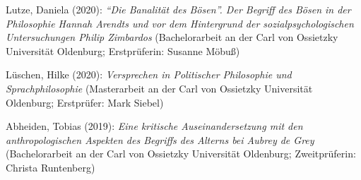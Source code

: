 \documentclass[a4paper,10pt]{article}
\newenvironment{literature}{%
   \parskip6pt\parindent0pt\raggedright
   \def\lititem{\hangindent=1cm\hangafter1}}{%
   \par\ignorespaces}
\begin{document}
\begin{literature}
\lititem Lutze, Daniela (2020): \textit{\enquote{Die Banalität des Bösen}. Der Begriff des Bösen in der Philosophie Hannah Arendts und vor dem Hintergrund der sozialpsychologischen Untersuchungen Philip Zimbardos} (Bachelorarbeit an der Carl von Ossietzky Universität Oldenburg; Erstprüferin: Susanne Möbuß)

\lititem Lüschen, Hilke (2020): \textit{Versprechen in Politischer Philosophie und Sprachphilosophie} (Masterarbeit an der Carl von Ossietzky Universität Oldenburg; Erstprüfer: Mark Siebel)

\lititem Abheiden, Tobias (2019): \textit{Eine kritische Auseinandersetzung mit den anthropologischen Aspekten des Begriffs des Alterns bei Aubrey de Grey} (Bachelorarbeit an der Carl von Ossietzky Universität Oldenburg; Zweitprüferin: Christa Runtenberg)
\end{literature}


\end{document}
